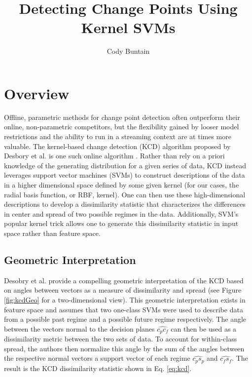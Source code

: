 \documentclass[12pt]{article}
\title{Detecting Change Points Using Kernel SVMs}
\author{Cody Buntain}
\date{}
\begin{document}
\maketitle

\section{Overview}

Offline, parametric methods for change point detection often outperform their online, non-parametric competitors, but the flexibility gained by looser model restrictions and the ability to run in a streaming context are at times more valuable.
The kernel-based change detection (KCD) algorithm proposed by Desbory et al. is one such online algorithm \cite{1468491}.
Rather than rely on a priori knowledge of the generating distribution for a given series of data, KCD instead leverages support vector machines (SVMs) to construct descriptions of the data in a higher dimensional space defined by some given kernel (for our cases, the radial basis function, or RBF, kernel).
One can then use these high-dimensional descriptions to develop a dissimilarity statistic that characterizes the differences in center and spread of two possible regimes in the data.
Additionally, SVM's popular kernel trick allows one to generate this dissimilarity statistic in input space rather than feature space.

\subsection{Geometric Interpretation}

Desobry et al. provide a compelling geometric interpretation of the KCD based on angles between vectors as a measure of dissimilarity and spread (see Figure \ref{fig:kcdGeo} for a two-dimensional view). 
This geometric interpretation exists in feature space and assumes that two one-class SVMs were used to describe data from a possible past regime and a possible future regime respectively. 
The angle between the vectors normal to the decision planes $\widehat{c_pc_f}$ can then be used as a dissimilarity metric between the two sets of data.
To account for within-class spread, the authors then normalize this angle by the sum of the angles between the respective normal vectors a support vector of each regime $\widehat{c_ps_p}$ and $\widehat{c_fs_f}$.
The result is the KCD dissimilarity statistic shown in Eq. \ref{eq:kcd}.
\end{document}
